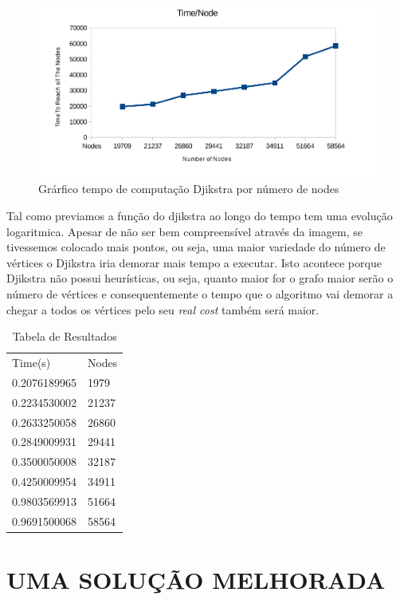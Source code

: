 \documentclass[a4paper]{article}
\begin{document}
\begin{figure}[H]
\includegraphics[scale = 0.5]{./Djikstra_Graph.png}
\centering
\caption{Grárfico tempo de computação Djikstra por número de nodes}
\end{figure}

Tal como previamos a função do djikstra ao longo do tempo tem uma evolução logaritmica. Apesar de não ser bem compreensível através da imagem, se tivessemos colocado mais pontos, ou seja, uma maior variedade do número de vértices o Djikstra iria demorar mais tempo a executar. Isto acontece porque Djikstra não possui heurísticas, ou seja, quanto maior for o grafo maior serão o número de vértices e consequentemente o tempo que o algoritmo vai demorar a chegar a todos os vértices pelo seu \textit{real cost} também será maior. 



\begin{table}[h]
\centering
\begin{tabular}{ll}
Time(s)      & Nodes \\
0.2076189965 & 1979  \\
0.2234530002 & 21237 \\
0.2633250058 & 26860 \\
0.2849009931 & 29441 \\
0.3500050008 & 32187 \\
0.4250009954 & 34911 \\
0.9803569913 & 51664 \\
0.9691500068 & 58564
\end{tabular}
\caption{Tabela de Resultados}
\label{my-label}
\end{table}

\setcounter{secnumdepth}{0}
\section{UMA SOLUÇÃO MELHORADA}
\end{document}

